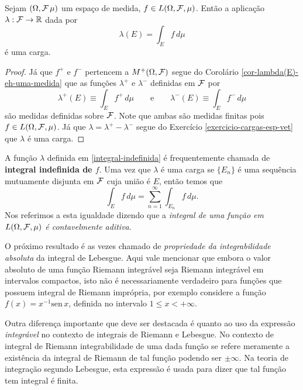 \begin{lema}\label{lema-int-f-dmu-define-uma-carga}
Sejam $(\Omega,\mathcal{F}\,\mu)$ um espaço de medida, 
$f\in L(\Omega,\mathcal{F},\mu)$. Então a aplicação 
$\lambda:\mathcal{F}\to\mathbb{R}$ dada por 
%
\begin{equation}\label{integral-indefinida}	
	\lambda(E)=\int_{E} f\, d\mu 
\end{equation}
%
é uma carga.
\end{lema}


\begin{proof}
Já que $f^+$ e $f^-$ pertencem a $M^{+}(\Omega,\mathcal{F})$
segue do Corolário \ref{cor-lambda(E)-eh-uma-medida}
que as funções $\lambda^{+}$ e $\lambda^{-}$ definidas
em $\mathcal{F}$ por 
	\[
		\lambda^{+}(E)\equiv \int_{E} f^{+}\, d\mu 
		\qquad\text{e}\qquad
		\lambda^{-}(E)\equiv \int_{E} f^{-}\, d\mu 		
	\] 
são medidas definidas sobre $\mathcal{F}$. Note que ambas são medidas finitas
pois $f\in L(\Omega,\mathcal{F},\mu)$. 
Já que $\lambda =\lambda^{+}-\lambda^{-}$ segue do 
Exercício \ref{exercicio-cargas-esp-vet}
que $\lambda$ é uma carga.
\end{proof}

A função $\lambda$ definida em \eqref{integral-indefinida}
é frequentemente chamada de 
{\bf integral indefinida de $f$}.
Uma vez que $\lambda$ é uma carga se $\{E_n\}$
é uma sequência mutuamente disjunta em $\mathcal{F}$ cuja 
união é $E$, então temos que
	\[
	\int_{E}f\, d\mu 
	=
	\sum_{n=1}^{\infty} \int_{E_n}f\, d\mu.	
	\]
Nos referimos a esta igualdade dizendo que 
a {\it integral de uma função em $L(\Omega,\mathcal{F},\mu)$ 
é contavelmente aditiva}.




O próximo resultado é as vezes chamado de 
{\it propriedade da integrabilidade absoluta}
da integral de Lebesgue. Aqui vale mencionar que 
embora o valor absoluto de uma função 
Riemann integrável seja Riemann integrável
em intervalos compactos, isto não é necessariamente
verdadeiro para funções que possuem 
integral de Riemann imprópria, 
por exemplo considere a função $f(x)=x^{-1}\text{sen}\, x$,
definida no intervalo $1\leq x<+\infty$.

Outra diferença importante que deve ser destacada
é quanto ao uso da expressão {\it integrável}
no contexto de integrais de Riemann e Lebesgue. 
No contexto de integral de Riemann integrabilidade
de uma dada função se refere meramente a existência da integral de Riemann 
de tal função podendo ser $\pm\infty$.
Na teoria de integração segundo Lebesgue, 
esta expressão é usada para dizer que tal função 
tem integral é finita. 






